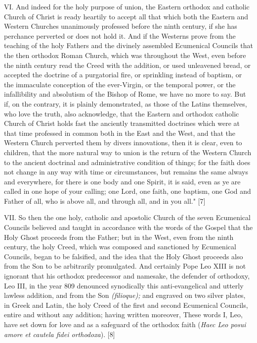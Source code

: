 VI. And indeed for the holy purpose of union, the Eastern orthodox and
catholic Church of Christ is ready heartily to accept all that which
both the Eastern and Western Churches unanimously professed before the
ninth century, if she has perchance perverted or does not hold it. And
if the Westerns prove from the teaching of the holy Fathers and the
divinely assembled Ecumenical Councils that the then orthodox Roman
Church, which was throughout the West, even before the ninth century
read the Creed with the addition, or used unleavened bread, or accepted
the doctrine of a purgatorial fire, or sprinkling instead of baptism, or
the immaculate conception of the ever-Virgin, or the temporal power, or
the infallibility and absolutism of the Bishop of Rome, we have no more
to say. But if, on the contrary, it is plainly demonstrated, as those of
the Latins themselves, who love the truth, also acknowledge, that the
Eastern and orthodox catholic Church of Christ holds fast the anciently
transmitted doctrines which were at that time professed in common both
in the East and the West, and that the Western Church perverted them by
divers innovations, then it is clear, even to children, that the more
natural way to union is the return of the Western Church to the ancient
doctrinal and administrative condition of things; for the faith does not
change in any way with time or circumstances, but remains the same
always and everywhere, for \textquotesingle there is one body and one
Spirit,\textquotesingle{} it is said, \textquotesingle even as ye are
called in one hope of your calling; one Lord, one faith, one baptism,
one God and Father of all, who is above all, and through all, and in you
all." {[}7{]}

VII. So then the one holy, catholic and apostolic Church of the seven
Ecumenical Councils believed and taught in accordance with the words of
the Gospel that the Holy Ghost proceeds from the Father; but in the
West, even from the ninth century, the holy Creed, which was composed
and sanctioned by Ecumenical Councils, began to be falsified, and the
idea that the Holy Ghost proceeds \textquotesingle also from the
Son\textquotesingle{} to be arbitrarily promulgated. And certainly Pope
Leo XIII is not ignorant that his orthodox predecessor and namesake, the
defender of orthodoxy, Leo III, in the year 809 denounced synodically
this anti-evangelical and utterly lawless addition, \textquotesingle and
from the Son\textquotesingle{} \emph{(filioque);} and engraved on two
silver plates, in Greek and Latin, the holy Creed of the first and
second Ecumenical Councils, entire and without any addition; having
written moreover, \textquotesingle These words I, Leo, have set down for
love and as a safeguard of the orthodox faith\textquotesingle{}
(\emph{Haec Leo posui amore et cautela fidei
orthodoxa}\textquotesingle). {[}8{]}


